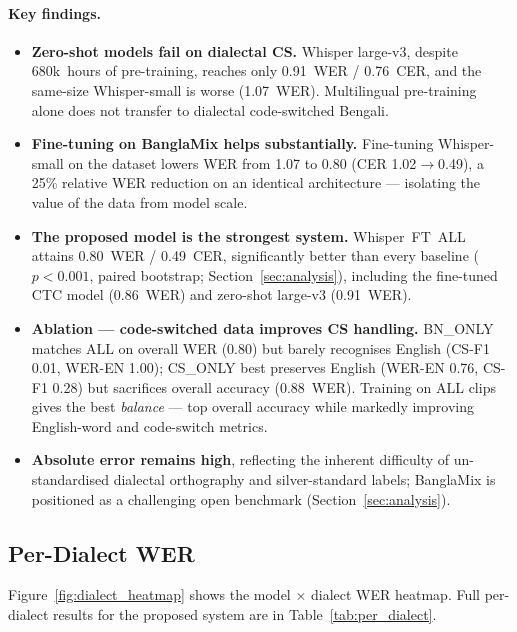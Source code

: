 \paragraph{Key findings.}

\begin{itemize}[leftmargin=*, itemsep=2pt]
  \item \textbf{Zero-shot models fail on dialectal CS.}
        Whisper large-v3, despite 680k~hours of pre-training, reaches only
        0.91~WER / 0.76~CER, and the same-size Whisper-small is worse
        (1.07~WER). Multilingual pre-training alone does not transfer to
        dialectal code-switched Bengali.
  \item \textbf{Fine-tuning on BanglaMix helps substantially.}
        Fine-tuning Whisper-small on the dataset lowers WER from 1.07 to 0.80
        (CER 1.02$\rightarrow$0.49), a 25\% relative WER reduction on an
        identical architecture --- isolating the value of the data from model
        scale.
  \item \textbf{The proposed model is the strongest system.}
        Whisper~FT~ALL attains 0.80~WER / 0.49~CER, significantly better than
        every baseline ($p<0.001$, paired bootstrap; Section~\ref{sec:analysis}),
        including the fine-tuned CTC model (0.86~WER) and zero-shot large-v3
        (0.91~WER).
  \item \textbf{Ablation --- code-switched data improves CS handling.}
        BN\_ONLY matches ALL on overall WER (0.80) but barely recognises
        English (CS-F1 0.01, WER-EN 1.00); CS\_ONLY best preserves English
        (WER-EN 0.76, CS-F1 0.28) but sacrifices overall accuracy (0.88~WER).
        Training on ALL clips gives the best \emph{balance} --- top overall
        accuracy while markedly improving English-word and code-switch metrics.
  \item \textbf{Absolute error remains high}, reflecting the inherent
        difficulty of un-standardised dialectal orthography and silver-standard
        labels; BanglaMix is positioned as a challenging open benchmark
        (Section~\ref{sec:analysis}).
\end{itemize}

\subsection{Per-Dialect WER}

Figure~\ref{fig:dialect_heatmap} shows the model $\times$ dialect WER heatmap.
Full per-dialect results for the proposed system are in
Table~\ref{tab:per_dialect}.


